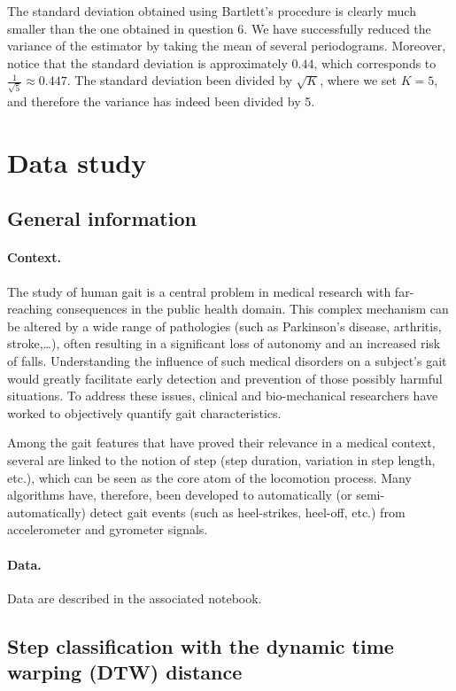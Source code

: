 \documentclass[11pt]{article}
\begin{document}
\begin{solution}
The standard deviation obtained using Bartlett's procedure is clearly much smaller than the one obtained in question 6. We have successfully reduced the variance of the estimator by taking the mean of several periodograms. Moreover, notice that the standard deviation is approximately $0.44$, which corresponds to $\frac{1}{\sqrt{5}} \approx 0.447$. The standard deviation been divided by $\sqrt{K}$, where we set $K = 5$, and therefore the variance has indeed been divided by 5.
\end{solution}
\section{Data study}

\subsection{General information}

\paragraph{Context.}
The study of human gait is a central problem in medical research with far-reaching consequences in the public health domain. This complex mechanism can be altered by a wide range of pathologies (such as Parkinson's disease, arthritis, stroke,\ldots), often resulting in a significant loss of autonomy and an increased risk of falls. Understanding the influence of such medical disorders on a subject's gait would greatly facilitate early detection and prevention of those possibly harmful situations. To address these issues, clinical and bio-mechanical researchers have worked to objectively quantify gait characteristics.

Among the gait features that have proved their relevance in a medical context, several are linked to the notion of step (step duration, variation in step length, etc.), which can be seen as the core atom of the locomotion process. Many algorithms have, therefore, been developed to automatically (or semi-automatically) detect gait events (such as heel-strikes, heel-off, etc.) from accelerometer and gyrometer signals.

\paragraph{Data.}
Data are described in the associated notebook.

\subsection{Step classification with the dynamic time warping (DTW) distance}
\end{document}
